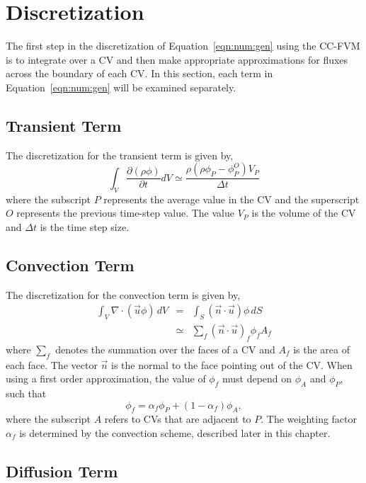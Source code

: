 \section{Discretization}

The first step in the discretization of Equation~\eqref{eqn:num:gen}
using the CC-FVM is to integrate over a CV and then make appropriate
approximations for fluxes across the boundary of each CV.  In this
section, each term in Equation~\eqref{eqn:num:gen} will be examined
separately.

\subsection{Transient Term}

The discretization for the transient term is given by,
\begin{equation}
\int_V \frac{\partial (\rho \phi)}{\partial t} dV
\simeq
\frac{\rho(\rho \phi_{P} - \phi_P^O) V_P}{\Delta t}
\label{eqn:num:tra}
\end{equation}
where the subscript $P$ represents the average value in the CV and
the superscript $O$ represents the previous time-step value.  The
value $V_P$ is the volume of the CV and $\Delta t$ is the time step
size.

\subsection{Convection Term}

The discretization for the convection term is given by,
\begin{eqnarray}
\int_V \nabla \cdot (\vec{u} \phi)\,dV & = & 
\int_S (\vec{n} \cdot \vec{u})\phi\,dS \\
& \simeq & \sum_{f} (\vec{n} \cdot \vec{u})_f \phi_f A_f
\label{eqn:num:con}
\end{eqnarray}
where $\sum_{f}$ denotes the summation over the faces of a CV and
$A_f$ is the area of each face.  The vector $\vec{n}$ is the normal to
the face pointing out of the CV. When using a first order
approximation, the value of $\phi_f$ must depend on $\phi_A$ and
$\phi_P$, such that
\begin{equation}
\phi_f=\alpha_f \phi_P +(1-\alpha_f)\phi_A,
\end{equation}
where the subscript $A$ refers to CVs that are adjacent to $P$.  The
weighting factor $\alpha_f$ is determined by the convection scheme,
described later in this chapter.

\subsection{Diffusion Term}

